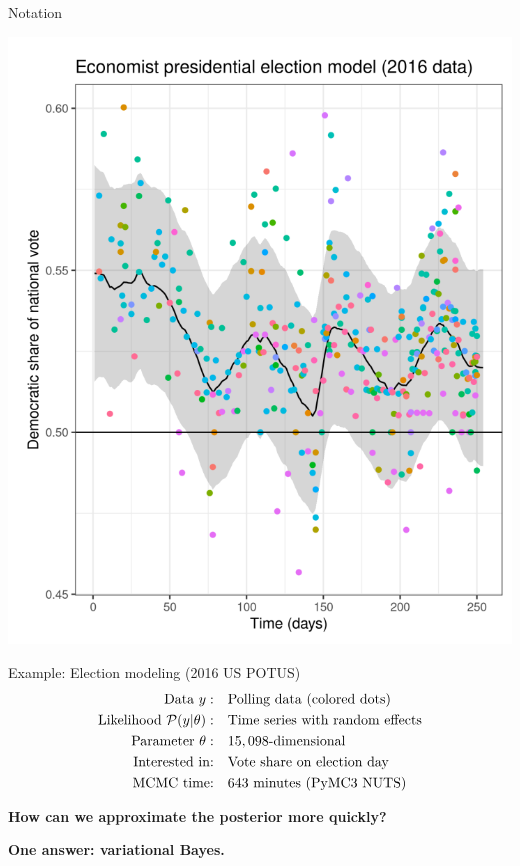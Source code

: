 \documentclass[8pt]{beamer}\usepackage[]{graphicx}\usepackage[]{color}
\begin{document}
\begin{frame}[t]{Notation}
\begin{minipage}{0.35\textwidth}
\includegraphics[width=\linewidth]{static_figures/election_data}
\end{minipage}
\begin{minipage}{0.63\textwidth}
    Example: Election modeling (2016 US POTUS)
    \begin{align*}
        \text{Data } y:&\quad \textrm{Polling data (colored dots)} \\
        \text{Likelihood } \mathcal{P}(y \vert \theta):&\quad \textrm{Time series with random effects}\\
        \text{Parameter }\theta:& \quad 15,098\textrm{-dimensional}\\
        \text{Interested in:}& \quad\textrm{Vote share on election day}\\
        \text{MCMC time:}& \quad 643 \textrm{ minutes (PyMC3 NUTS)}
    \end{align*}

    \textbf{How can we approximate the posterior more quickly?}

    \textbf{One answer: variational Bayes.}

\end{minipage}

\end{frame}
\end{document}
